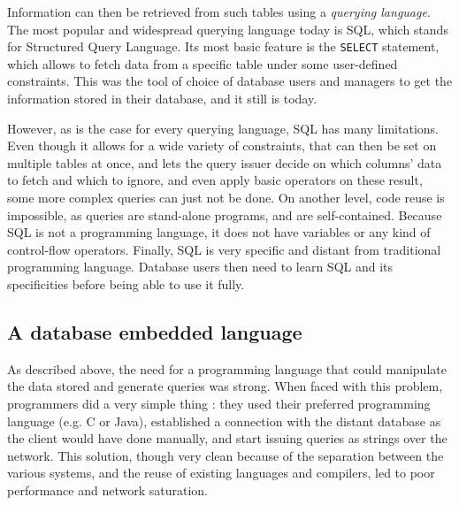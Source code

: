 \documentclass[twoside,11pt,a4paper]{article}
\newcommand{\sql}[1]{\texttt{#1}}
\begin{document}
Information can then be retrieved from such tables using a \textit{querying language}. The most popular and widespread querying language today is SQL, which stands for Structured Query Language. Its most basic feature is the \sql{SELECT} statement, which allows to fetch data from a specific table under some user-defined constraints. This was the tool of choice of database users and managers to get the information stored in their database, and it still is today.

However, as is the case for every querying language, SQL has many limitations. Even though it allows for a wide variety of constraints, that can then be set on multiple tables at once, and lets the query issuer decide on which columns' data to fetch and which to ignore, and even apply basic operators on these result, some more complex queries can just not be done. On another level, code reuse is impossible, as queries are stand-alone programs, and are self-contained. Because SQL is not a programming language, it does not have variables or any kind of control-flow operators. Finally, SQL is very specific and distant from traditional programming language. Database users then need to learn SQL and its specificities before being able to use it fully.

\subsection{A database embedded language}

As described above, the need for a programming language that could manipulate the data stored and generate queries was strong. When faced with this problem, programmers did a very simple thing : they used their preferred programming language (e.g. C or Java), established a connection with the distant database as the client would have done manually, and start issuing queries as strings over the network. This solution, though very clean because of the separation between the various systems, and the reuse of existing languages and compilers, led to poor performance and network saturation.

\end{document}
